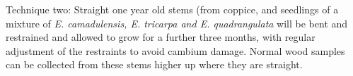 Technique two: Straight one year old stems (from coppice, and seedlings of a
mixture of \textit{E. camadulensis, E. tricarpa and E. quadrangulata} will be bent and restrained
and allowed to grow for a further three months, with regular adjustment of the
restraints to avoid cambium damage. Normal wood samples can be collected from
these stems higher up where they are straight.